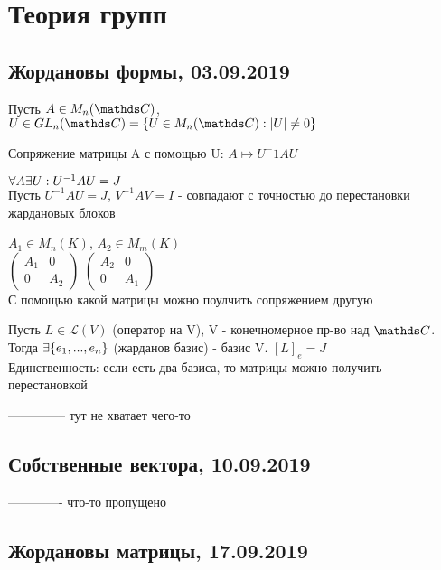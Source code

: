 \documentclass[12pt, fleqn]{article}
\begin{document}
  
\section{Теория групп}
\subsection{Жордановы формы, 03.09.2019}

\begin{utv}
    Пусть $A \in M_n(\CC)$, $U \in GL_n(\CC)=\{U \in M_n(\CC): |U| \neq 0\}$

    Сопряжение матрицы A с помощью U: $A \longmapsto U^-1 A U$
\end{utv}

\begin{theorem}
    $\forall A \exists U: U^{-1} A U = J$\\
    Пусть $U^{-1} A U = J$, $V^{-1} A V = I$ - совпадают с точностью до перестановки жардановых блоков
\end{theorem}

\begin{example}
    $A_1 \in M_n(K)$, $A_2 \in M_m(K)$\\
    $\begin{pmatrix}
      A_1 & 0\\
      0 & A_2
    \end{pmatrix}$
    $\begin{pmatrix}
      A_2 & 0\\
      0 & A_1
    \end{pmatrix}$\\
    С помощью какой матрицы можно поулчить сопряжением другую
\end{example}

\begin{theorem}
    Пусть $L \in \mathscr{L}(V)$ (оператор на V), V - конечномерное пр-во над $\CC$. Тогда $\exists \{e_1,...,e_n\}$ (жарданов базис) - базис V. $[L]_e=J$\\
    Единственность: если есть два базиса, то матрицы можно получить перестановкой
\end{theorem}
-------------- тут не хватает чего-то
\subsection{Собственные вектора, 10.09.2019}
------------- что-то пропущено\\
\subsection{Жордановы матрицы, 17.09.2019}
\end{document}
